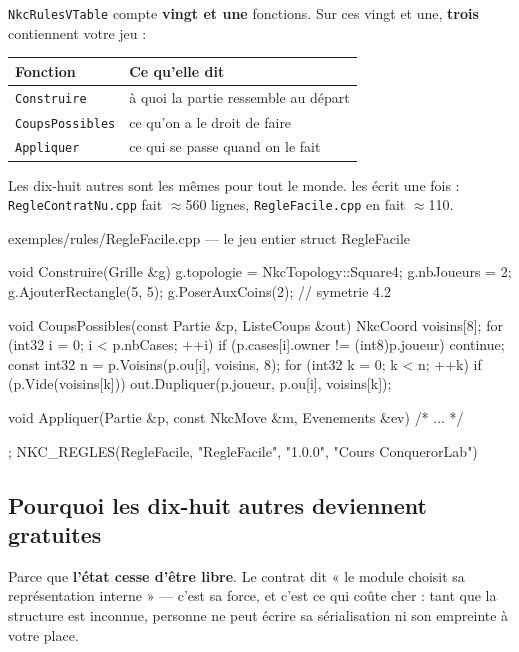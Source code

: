 \texttt{NkcRulesVTable} compte \textbf{vingt et une} fonctions. Sur ces vingt et
une, \textbf{trois} contiennent votre jeu :

\begin{center}
\begin{tabular}{@{}p{4.0cm}p{9.8cm}@{}}
\toprule
\textbf{Fonction} & \textbf{Ce qu'elle dit} \\
\midrule
\texttt{Construire} & à quoi la partie ressemble au départ \\
\texttt{CoupsPossibles} & ce qu'on a le droit de faire \\
\texttt{Appliquer} & ce qui se passe quand on le fait \\
\bottomrule
\end{tabular}
\end{center}

Les dix-huit autres sont les mêmes pour tout le monde.
 les écrit une fois : \texttt{RegleContratNu.cpp}
fait $\approx$560 lignes, \texttt{RegleFacile.cpp} en fait $\approx$110.

\begin{nkcode}{exemples/rules/RegleFacile.cpp — le jeu entier}
struct RegleFacile {
    void Construire(Grille &g) {
        g.topologie = NkcTopology::Square4;
        g.nbJoueurs = 2;
        g.AjouterRectangle(5, 5);
        g.PoserAuxCoins(2);       // symetrie 4.2
    }

    void CoupsPossibles(const Partie &p, ListeCoups &out) {
        NkcCoord voisins[8];
        for (int32 i = 0; i < p.nbCases; ++i) {
            if (p.cases[i].owner != (int8)p.joueur) continue;
            const int32 n = p.Voisins(p.ou[i], voisins, 8);
            for (int32 k = 0; k < n; ++k)
                if (p.Vide(voisins[k]))
                    out.Dupliquer(p.joueur, p.ou[i], voisins[k]);
        }
    }

    void Appliquer(Partie &p, const NkcMove &m, Evenements &ev) { /* ... */ }
};
NKC_REGLES(RegleFacile, "RegleFacile", "1.0.0", "Cours ConquerorLab")
\end{nkcode}

\subsection{Pourquoi les dix-huit autres deviennent gratuites}

Parce que \textbf{l'état cesse d'être libre}. Le contrat dit « le module choisit
sa représentation interne » — c'est sa force, et c'est ce qui coûte cher : tant
que la structure est inconnue, personne ne peut écrire sa sérialisation ni son
empreinte à votre place.

